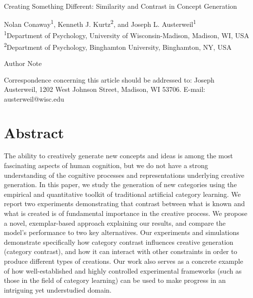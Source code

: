 \documentclass[12pt]{article}
\begin{document}
\begin{center}
\hfill
\\[1in]

Creating Something Different: Similarity and Contrast in Concept Generation


\vfill

Nolan Conaway\textsuperscript{1}, 
Kenneth J. Kurtz\textsuperscript{2}, 
and Joseph L. Austerweil\textsuperscript{1}
\\[\baselineskip]
\textsuperscript{1}Department of Psychology, University of Wisconsin-Madison, Madison, WI, USA
\textsuperscript{2}Department of Psychology, Binghamton University, Binghamton, NY, USA
\\[1in]

\vfill

Author Note

Correspondence concerning this article should be addressed to: 
Joseph Austerweil, 1202 West Johnson Street, Madison, WI 53706.
E-mail: austerweil@wisc.edu

\end{center}
\clearpage


\doublespacing
\section*{Abstract}

The ability to creatively generate new concepts and ideas is among the most fascinating aspects of human cognition, but we do not have a strong understanding of the cognitive processes and representations underlying creative generation. In this paper, we study the generation of new categories using the empirical and quantitative toolkit of traditional artificial category learning. We report two experiments demonstrating that contrast between what is known and what is created is of fundamental importance in the creative process. We propose a novel, exemplar-based approach explaining our results, and compare the model's performance to two key alternatives. Our experiments and simulations demonstrate specifically how category contrast influences creative generation (category contrast), and how it can interact with other constraints in order to produce different types of creations. Our work also serves as a concrete example of how well-established and highly controlled experimental frameworks (such as those in the field of category learning) can be used to make progress in an intriguing yet understudied domain.
\end{document}
